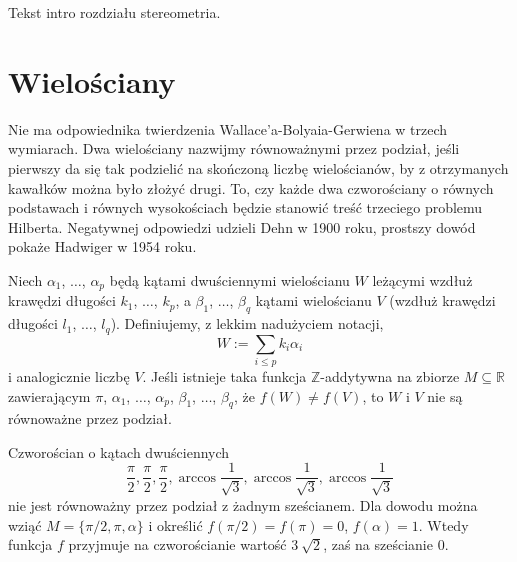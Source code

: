 
Tekst intro rozdziału stereometria.

\section{Wielościany}

Nie ma odpowiednika twierdzenia Wallace'a-Bolyaia-Gerwiena w trzech wymiarach.
Dwa wielościany nazwijmy równoważnymi przez podział, jeśli pierwszy da się tak podzielić na skończoną liczbę wielościanów, by z otrzymanych kawałków można było złożyć drugi.
To, czy każde dwa czworościany o równych podstawach i równych wysokościach będzie stanowić treść trzeciego problemu Hilberta.
Negatywnej odpowiedzi udzieli Dehn w 1900 roku, prostszy dowód pokaże Hadwiger w 1954 roku.

\begin{theorem}[Hadwigera] %
    Niech $\alpha_1$, $\ldots$, $\alpha_p$ będą kątami dwuściennymi wielościanu $W$ leżącymi wzdłuż krawędzi długości $k_1$, $\ldots$, $k_p$, a $\beta_1$, $\ldots$, $\beta_q$ kątami wielościanu $V$ (wzdłuż krawędzi długości $l_1$, $\ldots$, $l_q$).
    Definiujemy, z lekkim nadużyciem notacji,
    \begin{equation}
        W := \sum_{i \le p} k_i \alpha_i
    \end{equation}
    i analogicznie liczbę $V$.
    Jeśli istnieje taka funkcja $\mathbb Z$-addytywna na zbiorze $M \subseteq \mathbb R$ zawierającym $\pi$, $\alpha_1$, $\ldots$, $\alpha_p$, $\beta_1$, $\ldots$, $\beta_q$, że $f(W) \neq f(V)$, to $W$ i $V$ nie są równoważne przez podział.
\end{theorem}

\begin{corollary}
    Czworościan o kątach dwuściennych
    \begin{equation}
        \frac \pi 2, \frac \pi 2, \frac \pi 2,
        \arccos \frac{1}{\sqrt 3}, \arccos \frac{1}{\sqrt 3}, \arccos \frac{1}{\sqrt 3}
    \end{equation}
    nie jest równoważny przez podział z żadnym sześcianem.
    Dla dowodu można wziąć $M = \{\pi/2, \pi, \alpha\}$ i określić $f(\pi/2) = f(\pi) = 0$, $f(\alpha) = 1$.
    Wtedy funkcja $f$ przyjmuje na czworościanie wartość $3 \ \sqrt 2$, zaś na sześcianie $0$.
\end{corollary}

